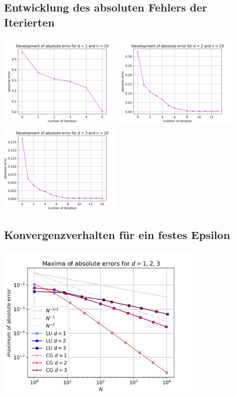 \documentclass{scrartcl}
\begin{document}
\subsection{Entwicklung des absoluten Fehlers der Iterierten}
{
  \centering
    \includegraphics[width=0.45\textwidth]{Grafiken/iterates_d1_n10}
    \includegraphics[width=0.45\textwidth]{Grafiken/iterates_d2_n10}
    \includegraphics[width=0.45\textwidth]{Grafiken/iterates_d3_n10}
    \vspace{-0.2cm}
}
\vspace{0.5cm}

\pagebreak
\subsection{Konvergenzverhalten für ein festes Epsilon}
{
  \centering
    \includegraphics[width=0.75\textwidth]{Grafiken/compare}
    \vspace{-0.2cm}
}
\vspace{0.5cm}
\end{document}
